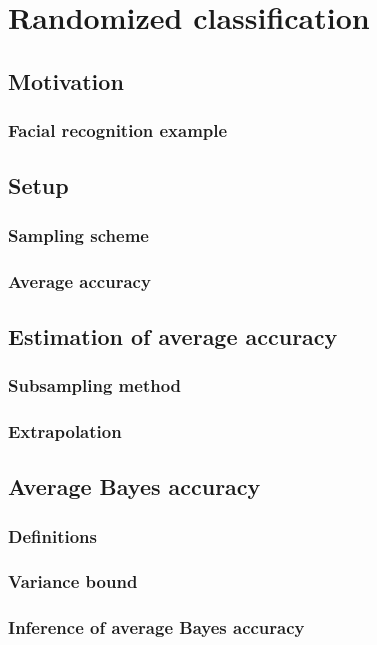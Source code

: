 
\chapter{Randomized classification} %

\label{Chapter2} %


\section{Motivation}

\subsection{Facial recognition example}

\section{Setup}

\subsection{Sampling scheme}

\subsection{Average accuracy}

\section{Estimation of average accuracy}

\subsection{Subsampling method}

\subsection{Extrapolation}

\section{Average Bayes accuracy}

\subsection{Definitions}

\subsection{Variance bound}

\subsection{Inference of average Bayes accuracy}